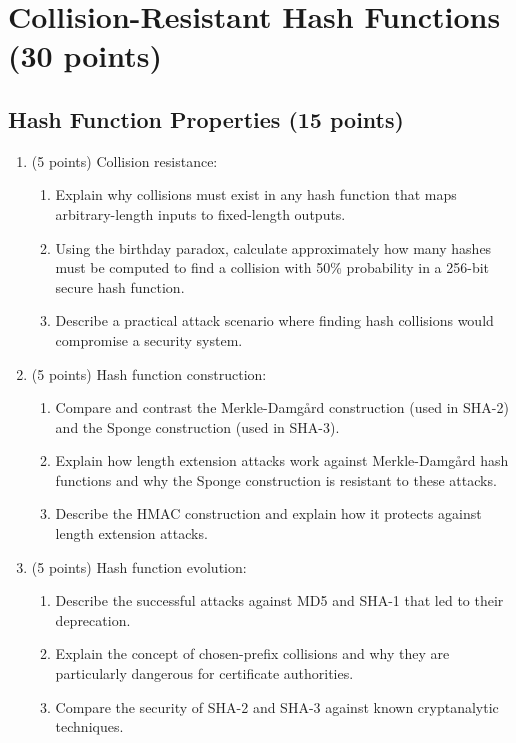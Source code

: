 \documentclass[10pt,a4paper,american]{exam}
\begin{document}
\section{Collision-Resistant Hash Functions (30 points)}

\subsection{Hash Function Properties (15 points)}

\begin{enumerate}
	\item (5 points) Collision resistance:
	      \begin{enumerate}
		      \item Explain why collisions must exist in any hash function that maps arbitrary-length inputs to fixed-length outputs.
		      \item Using the birthday paradox, calculate approximately how many hashes must be computed to find a collision with 50\% probability in a 256-bit secure hash function.
		      \item Describe a practical attack scenario where finding hash collisions would compromise a security system.
	      \end{enumerate}

	\item (5 points) Hash function construction:
	      \begin{enumerate}
		      \item Compare and contrast the Merkle-Damg\aa rd construction (used in SHA-2) and the Sponge construction (used in SHA-3).
		      \item Explain how length extension attacks work against Merkle-Damg\aa rd hash functions and why the Sponge construction is resistant to these attacks.
		      \item Describe the HMAC construction and explain how it protects against length extension attacks.
	      \end{enumerate}

	\item (5 points) Hash function evolution:
	      \begin{enumerate}
		      \item Describe the successful attacks against MD5 and SHA-1 that led to their deprecation.
		      \item Explain the concept of chosen-prefix collisions and why they are particularly dangerous for certificate authorities.
		      \item Compare the security of SHA-2 and SHA-3 against known cryptanalytic techniques.
	      \end{enumerate}
\end{enumerate}
\end{document}
